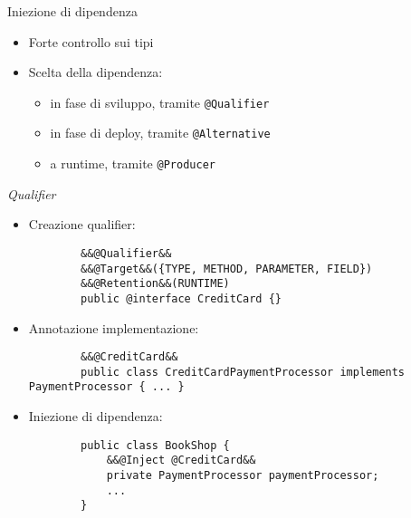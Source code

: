 \begin{frame}{Iniezione di dipendenza}

\begin{itemize}
\item Forte controllo sui tipi

\vspace{1em}

\item Scelta della dipendenza:

	\begin{itemize}
	
	\vspace{0.5em}
	
	\item in fase di sviluppo, tramite \texttt{@Qualifier}
	
	\vspace{0.8em}
	
	\item in fase di deploy, tramite \texttt{@Alternative}
	
	\vspace{0.8em}
	
	\item a runtime, tramite \texttt{@Producer}
	
	\end{itemize}

\end{itemize}

\end{frame}



\begin{frame}[fragile]{\textsl{Qualifier}}


\begin{itemize}
\item Creazione qualifier:
	\begin{lstlisting}
		&&@Qualifier&&
		&&@Target&&({TYPE, METHOD, PARAMETER, FIELD})
		&&@Retention&&(RUNTIME)
		public @interface CreditCard {}
	\end{lstlisting}

\item Annotazione implementazione:
	\begin{lstlisting}
		&&@CreditCard&&
		public class CreditCardPaymentProcessor implements PaymentProcessor { ... }
	\end{lstlisting}

\item Iniezione di dipendenza:
	\begin{lstlisting}
		public class BookShop {
		    &&@Inject @CreditCard&&
		    private PaymentProcessor paymentProcessor;
		    ...
		}
	\end{lstlisting}

\end{itemize}
\end{frame}





